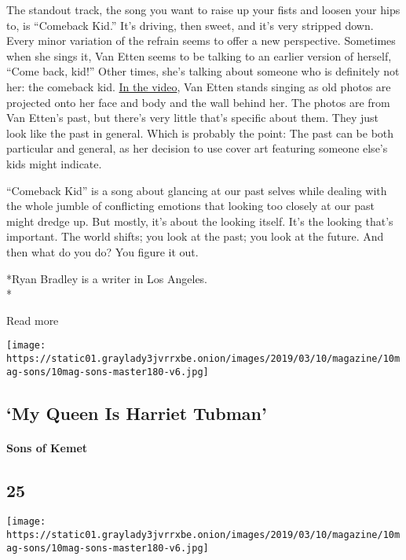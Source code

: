 The standout track, the song you want to raise up your fists and loosen
your hips to, is ``Comeback Kid.'' It's driving, then sweet, and it's
very stripped down. Every minor variation of the refrain seems to offer
a new perspective. Sometimes when she sings it, Van Etten seems to be
talking to an earlier version of herself, ``Come back, kid!'' Other
times, she's talking about someone who is definitely not her: the
comeback kid. \href{https://www.youtube.com/watch?v=h4mewwymxbI}{In the
video}, Van Etten stands singing as old photos are projected onto her
face and body and the wall behind her. The photos are from Van Etten's
past, but there's very little that's specific about them. They just look
like the past in general. Which is probably the point: The past can be
both particular and general, as her decision to use cover art featuring
someone else's kids might indicate.

``Comeback Kid'' is a song about glancing at our past selves while
dealing with the whole jumble of conflicting emotions that looking too
closely at our past might dredge up. But mostly, it's about the looking
itself. It's the looking that's important. The world shifts; you look at
the past; you look at the future. And then what do you do? You figure it
out.

*Ryan Bradley is a writer in Los Angeles.\\
*

Read more

\texttt{[image: https://static01.graylady3jvrrxbe.onion/images/2019/03/10/magazine/10mag-sons/10mag-sons-master180-v6.jpg]}

\hypertarget{--my-queen-is-harriet-tubman}{%
\subsection{\texorpdfstring{ `My Queen Is Harriet
Tubman'}{  `My Queen Is Harriet Tubman'}}\label{--my-queen-is-harriet-tubman}}

\hypertarget{sons-of-kemet}{%
\paragraph{Sons of Kemet}\label{sons-of-kemet}}

\hypertarget{25}{%
\subsection{25}\label{25}}

\texttt{[image: https://static01.graylady3jvrrxbe.onion/images/2019/03/10/magazine/10mag-sons/10mag-sons-master180-v6.jpg]}

